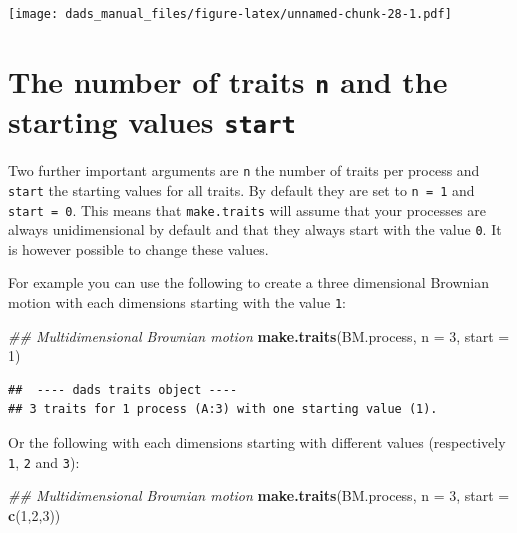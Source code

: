 \documentclass[]{book}
\newenvironment{Shaded}{\begin{snugshade}}{\end{snugshade}}
\newcommand{\CommentTok}[1]{\textcolor[rgb]{0.56,0.35,0.01}{\textit{#1}}}
\newcommand{\DataTypeTok}[1]{\textcolor[rgb]{0.13,0.29,0.53}{#1}}
\newcommand{\DecValTok}[1]{\textcolor[rgb]{0.00,0.00,0.81}{#1}}
\newcommand{\KeywordTok}[1]{\textcolor[rgb]{0.13,0.29,0.53}{\textbf{#1}}}
\newcommand{\NormalTok}[1]{#1}
\begin{document}
\texttt{[image: dads\_manual\_files/figure-latex/unnamed-chunk-28-1.pdf]}

\hypertarget{the-number-of-traits-n-and-the-starting-values-start}{%
\section{\texorpdfstring{The number of traits \texttt{n} and the starting values \texttt{start}}{The number of traits n and the starting values start}}\label{the-number-of-traits-n-and-the-starting-values-start}}

Two further important arguments are \texttt{n} the number of traits per process and \texttt{start} the starting values for all traits.
By default they are set to \texttt{n\ =\ 1} and \texttt{start\ =\ 0}.
This means that \texttt{make.traits} will assume that your processes are always unidimensional by default and that they always start with the value \texttt{0}.
It is however possible to change these values.

For example you can use the following to create a three dimensional Brownian motion with each dimensions starting with the value \texttt{1}:

\begin{Shaded}
\begin{Highlighting}[]
\CommentTok{## Multidimensional Brownian motion}
\KeywordTok{make.traits}\NormalTok{(BM.process, }\DataTypeTok{n =} \DecValTok{3}\NormalTok{, }\DataTypeTok{start =} \DecValTok{1}\NormalTok{)}
\end{Highlighting}
\end{Shaded}

\begin{verbatim}
##  ---- dads traits object ---- 
## 3 traits for 1 process (A:3) with one starting value (1).
\end{verbatim}

Or the following with each dimensions starting with different values (respectively \texttt{1}, \texttt{2} and \texttt{3}):

\begin{Shaded}
\begin{Highlighting}[]
\CommentTok{## Multidimensional Brownian motion}
\KeywordTok{make.traits}\NormalTok{(BM.process, }\DataTypeTok{n =} \DecValTok{3}\NormalTok{, }\DataTypeTok{start =} \KeywordTok{c}\NormalTok{(}\DecValTok{1}\NormalTok{,}\DecValTok{2}\NormalTok{,}\DecValTok{3}\NormalTok{))}
\end{Highlighting}
\end{Shaded}
\end{document}
